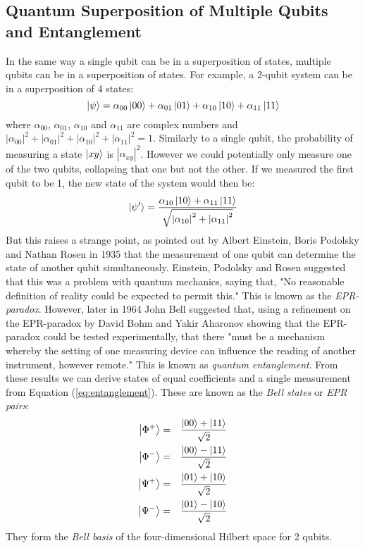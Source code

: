\documentclass[reqno]{amsart}
\numberwithin{equation}{section}
\numberwithin{figure}{section}
\begin{document}
\subsection{Quantum Superposition of Multiple Qubits and Entanglement}
\begin{justify}
    In the same way a single qubit can be in a superposition of states, multiple qubits can be in a superposition of states. For example, a 2-qubit system can be in a superposition of 4 states:
    \begin{equation}
        \ket{\psi} = \alpha_{00}\ket{00} + \alpha_{01}\ket{01} + \alpha_{10}\ket{10} + \alpha_{11}\ket{11} \label{eq:entanglement}
    \end{equation}
    where $\alpha_{00}$, $\alpha_{01}$, $\alpha_{10}$ and $\alpha_{11}$ are complex numbers and $|\alpha_{00}|^{2} + |\alpha_{01}|^{2} + |\alpha_{10}|^{2} + |\alpha_{11}|^{2} = 1$. Similarly to a single qubit, the probability of measuring a state $\ket{xy}$ is $|\alpha_{xy}|^{2}$. However we could potentially only measure one of the two qubits, collapsing that one but not the other. If we measured the first qubit to be 1, the new state of the system would then be:
    \begin{equation}
        \ket{\psi'} = \frac{\alpha_{10}\ket{10}+\alpha_{11}\ket{11}}{\sqrt{\abs{\alpha_{10}}^{2} + \abs{\alpha_{11}}^{2}}}
    \end{equation}
    But this raises a strange point, as pointed out by Albert Einstein, Boris Podolsky and Nathan Rosen in 1935 \cite{EinsteinPodolskyRosen1935} that the measurement of one qubit can determine the state of another qubit simultaneously. Einstein, Podolsky and Rosen suggested that this was a problem with quantum mechanics, saying that, "No reasonable definition of reality could be expected to permit this." This is known as the \textit{EPR-paradox}. However, later in 1964 John Bell suggested that, using a refinement on the EPR-paradox by David Bohm and Yakir Aharonov \cite{BohmAharonov1957} showing that the EPR-paradox could be tested experimentally, that there "must be a mechanism whereby the setting of one measuring device can influence the reading of another instrument, however remote." \cite{Bell1964} This is known as \textit{quantum entanglement}. From these results we can derive states of equal coefficients and a single measurement from Equation (\ref{eq:entanglement}). These are known as the \textit{Bell states} or \textit{EPR pairs}: 
        \begin{eqnarray}
            \ket{\Phi^{+}} &=& \frac{\ket{00} + \ket{11}}{\sqrt{2}} \label{eqn:bellphi+} \\
            \ket{\Phi^{-}} &=& \frac{\ket{00} - \ket{11}}{\sqrt{2}} \label{eqn:bellphi-} \\
            \ket{\Psi^{+}} &=& \frac{\ket{01} + \ket{10}}{\sqrt{2}} \label{eqn:bellpsi+} \\
            \ket{\Psi^{-}} &=& \frac{\ket{01} - \ket{10}}{\sqrt{2}} \label{eqn:bellpsi-} 
        \end{eqnarray}
They form the \textit{Bell basis} of the four-dimensional Hilbert space for 2 qubits.
\end{justify}
\end{document}
